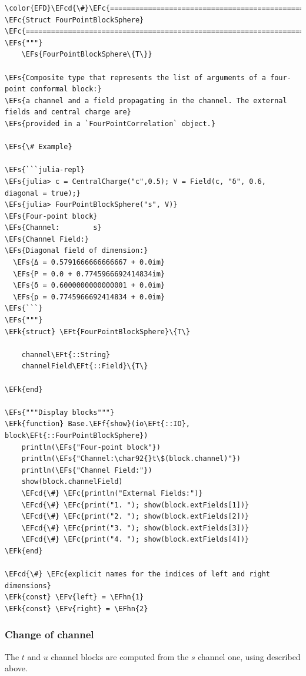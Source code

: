 \documentclass[a4paper]{article}
\numberwithin{equation}{section}
\newcommand{\EFc}[1]{\textcolor{EFc}{#1}} %
\newcommand{\EFcd}[1]{\textcolor{EFcd}{#1}} %
\newcommand{\EFs}[1]{\textcolor{EFs}{#1}} %
\newcommand{\EFk}[1]{\textcolor{EFk}{#1}} %
\newcommand{\EFf}[1]{\textcolor{EFf}{#1}} %
\newcommand{\EFv}[1]{\textcolor{EFv}{#1}} %
\newcommand{\EFt}[1]{\textcolor{EFt}{#1}} %
\newcommand{\EFhn}[1]{\textcolor{EFhn}{#1}} %
\begin{document}
\begin{Code}
\begin{Verbatim}
\color{EFD}\EFcd{\#}\EFc{===========================================================================================}
\EFc{Struct FourPointBlockSphere}
\EFc{===========================================================================================\#}
\EFs{"""}
    \EFs{FourPointBlockSphere\{T\}}

\EFs{Composite type that represents the list of arguments of a four-point conformal block:}
\EFs{a channel and a field propagating in the channel. The external fields and central charge are}
\EFs{provided in a `FourPointCorrelation` object.}

\EFs{\# Example}

\EFs{```julia-repl}
\EFs{julia> c = CentralCharge("c",0.5); V = Field(c, "δ", 0.6, diagonal = true);}
\EFs{julia> FourPointBlockSphere("s", V)}
\EFs{Four-point block}
\EFs{Channel:        s}
\EFs{Channel Field:}
\EFs{Diagonal field of dimension:}
  \EFs{Δ = 0.5791666666666667 + 0.0im}
  \EFs{P = 0.0 + 0.7745966692414834im}
  \EFs{δ = 0.6000000000000001 + 0.0im}
  \EFs{p = 0.7745966692414834 + 0.0im}
\EFs{```}
\EFs{"""}
\EFk{struct} \EFt{FourPointBlockSphere}\{T\}

    channel\EFt{::String}
    channelField\EFt{::Field}\{T\}

\EFk{end}

\EFs{"""Display blocks"""}
\EFk{function} Base.\EFf{show}(io\EFt{::IO}, block\EFt{::FourPointBlockSphere})
    println(\EFs{"Four-point block"})
    println(\EFs{"Channel:\char92{}t\$(block.channel)"})
    println(\EFs{"Channel Field:"})
    show(block.channelField)
    \EFcd{\#} \EFc{println("External Fields:")}
    \EFcd{\#} \EFc{print("1. "); show(block.extFields[1])}
    \EFcd{\#} \EFc{print("2. "); show(block.extFields[2])}
    \EFcd{\#} \EFc{print("3. "); show(block.extFields[3])}
    \EFcd{\#} \EFc{print("4. "); show(block.extFields[4])}
\EFk{end}

\EFcd{\#} \EFc{explicit names for the indices of left and right dimensions}
\EFk{const} \EFv{left} = \EFhn{1}
\EFk{const} \EFv{right} = \EFhn{2}
\end{Verbatim}
\end{Code}
\subsubsection*{Change of channel}
\label{sec:org3b4a8e8}

The \(t\) and \(u\) channel blocks are computed from the \(s\) channel one, using described above.
\end{document}

